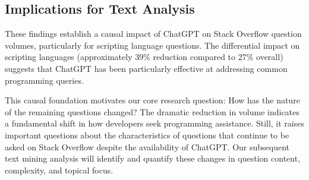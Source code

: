 
\subsection{Implications for Text Analysis}

These findings establish a causal impact of ChatGPT on Stack Overflow question volumes, particularly for scripting language questions. The differential impact on scripting languages (approximately 39\% reduction compared to 27\% overall) suggests that ChatGPT has been particularly effective at addressing common programming queries.

This causal foundation motivates our core research question: How has the nature of the remaining questions changed? The dramatic reduction in volume indicates a fundamental shift in how developers seek programming assistance. Still, it raises important questions about the characteristics of questions that continue to be asked on Stack Overflow despite the availability of ChatGPT. Our subsequent text mining analysis will identify and quantify these changes in question content, complexity, and topical focus.